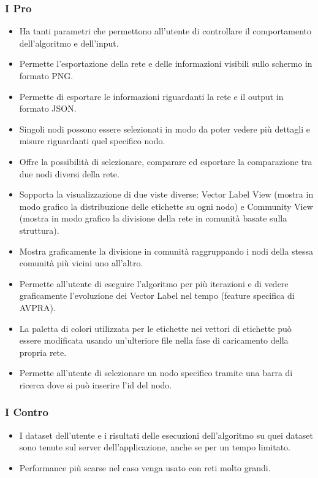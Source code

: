 \documentclass[a4paper,12pt]{report}
\begin{document}
			\subsubsection*{I Pro}
				\begin{itemize}
					\item Ha tanti parametri che permettono all'utente di controllare il comportamento dell'algoritmo e dell'input.
					\item Permette l'esportazione della rete e delle informazioni visibili sullo schermo in formato PNG.
					\item Permette di esportare le informazioni riguardanti la rete e il output in formato JSON.
					\item Singoli nodi possono essere selezionati in modo da poter vedere più dettagli e misure riguardanti quel specifico nodo.
					\item Offre la possibilità di selezionare, comparare ed esportare la comparazione tra due nodi diversi della rete.
					\item Sopporta la visualizzazione di due viste diverse: Vector Label View (mostra in modo grafico la distribuzione delle etichette su ogni nodo) e Community View (mostra in modo grafico la divisione della rete in comunità basate sulla struttura).
					\item Mostra graficamente la divisione in comunità raggruppando i nodi della stessa comunità più vicini uno all'altro.
					\item Permette all'utente di eseguire l'algoritmo per più iterazioni e di vedere graficamente l'evoluzione dei Vector Label nel tempo (feature specifica di AVPRA).
					\item La paletta di colori utilizzata per le etichette nei vettori di etichette può essere modificata usando un'ulteriore file nella fase di caricamento della propria rete.
					\item Permette all'utente di selezionare un nodo specifico tramite una barra di ricerca dove si può inserire l'id del nodo.
				\end{itemize}
						
			\subsubsection*{I Contro}
				\begin{itemize}
					\item I dataset dell'utente e i risultati delle esecuzioni dell'algoritmo su quei dataset sono tenute sul server dell'applicazione, anche se per un tempo limitato.
					\item Performance più scarse nel caso venga usato con reti molto grandi.
				\end{itemize}
\end{document}
